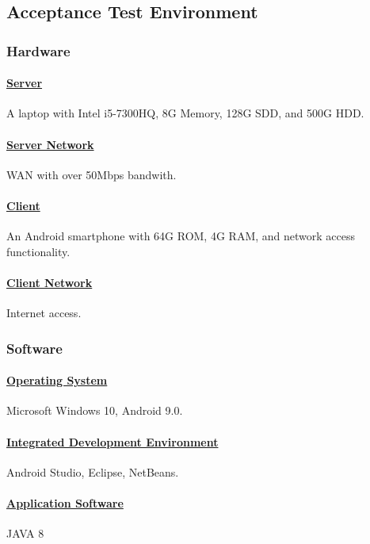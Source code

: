 \documentclass[10pt]{article}
\begin{document}
\subsection{Acceptance Test Environment}
\subsubsection{Hardware}
\paragraph{\underline{Server}}
A laptop with Intel i5-7300HQ, 8G Memory, 128G SDD, and 500G HDD.

\paragraph{\underline{Server Network}}
WAN with over 50Mbps bandwith.

\paragraph{\underline{Client}}
An Android smartphone with 64G ROM, 4G RAM, and network access functionality.

\paragraph{\underline{Client Network}}
Internet access.

\subsubsection{Software}
\paragraph{\underline{Operating System}}
Microsoft Windows 10, Android 9.0.

\paragraph{\underline{Integrated Development Environment}}
Android Studio, Eclipse, NetBeans.

\paragraph{\underline{Application Software}}
JAVA 8
\end{document}

